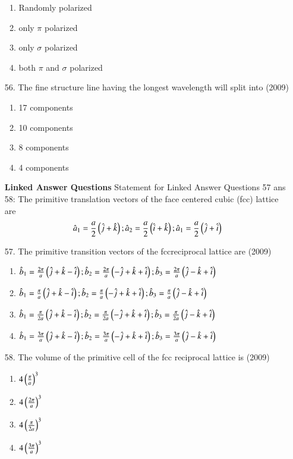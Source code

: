 \documentclass[journal]{IEEEtran}
\begin{document}
\begin{enumerate}
\begin{enumerate}[label=(\Alph*)]
        \item Randomly polarized
        \item only $\pi$ polarized
        \item only $\sigma$ polarized
        \item both $\pi$ and $\sigma$ polarized
     \end{enumerate}
     \item[56.]  The fine structure line having the longest wavelength will split into \hfill (2009)
     \begin{enumerate}[label=(\Alph*)]
        \item  17 components
        \item  10 components
        \item  8 components
        \item  4 components
     \end{enumerate}
     \textbf{Linked Answer Questions}
     Statement for Linked Answer Questions 57 ans 58:
    The primitive translation vectors of the face centered cubic (fcc) lattice are 
    $$\hat{a}_1 = \frac{a}{2}\left(\hat{j}+\hat{k}\right);\hat{a}_2 = \frac{a}{2}\left(\hat{i}+\hat{k}\right);\hat{a}_1 = \frac{a}{2}\left(\hat{j}+\hat{i}\right)$$
    \item[57.] The primitive transition vectors of the fccreciprocal lattice are \hfill (2009)
    \begin{enumerate}[label=(\Alph*)]
        \item $\hat{b}_1 = \frac{2\pi}{a}\left(\hat{j}+\hat{k}-\hat{i}\right);\hat{b}_2 = \frac{2\pi}{a}\left(-\hat{j}+\hat{k}+\hat{i}\right);\hat{b}_3 = \frac{2\pi}{a}\left(\hat{j}-\hat{k}+\hat{i}\right)$
        \item $\hat{b}_1 = \frac{\pi}{a}\left(\hat{j}+\hat{k}-\hat{i}\right);\hat{b}_2 = \frac{\pi}{a}\left(-\hat{j}+\hat{k}+\hat{i}\right);\hat{b}_3 = \frac{\pi}{a}\left(\hat{j}-\hat{k}+\hat{i}\right)$
        \item $\hat{b}_1 = \frac{\pi}{2a}\left(\hat{j}+\hat{k}-\hat{i}\right);\hat{b}_2 = \frac{\pi}{2a}\left(-\hat{j}+\hat{k}+\hat{i}\right);\hat{b}_3 = \frac{\pi}{2a}\left(\hat{j}-\hat{k}+\hat{i}\right)$
        \item $\hat{b}_1 = \frac{3\pi}{a}\left(\hat{j}+\hat{k}-\hat{i}\right);\hat{b}_2 = \frac{3\pi}{a}\left(-\hat{j}+\hat{k}+\hat{i}\right);\hat{b}_3 = \frac{3\pi}{a}\left(\hat{j}-\hat{k}+\hat{i}\right)$
    \end{enumerate}
    \item[58.] The volume of the primitive cell of the fcc reciprocal lattice is \hfill (2009)
    \begin{enumerate}[label=(\Alph*)]
        \item $4\left(\frac{\pi}{a}\right)^3$
        \item $4\left(\frac{2\pi}{a}\right)^3$
        \item $4\left(\frac{\pi}{2a}\right)^3$
        \item $4\left(\frac{3\pi}{a}\right)^3$
    \end{enumerate}
    

\end{enumerate}
\end{document}
